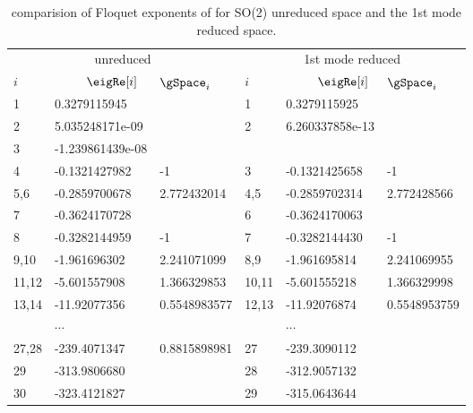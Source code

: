 \begin{table}[ht]
  \centering
  \begin{tabular}{l l l |l l l}
    \multicolumn{3}{c}{unreduced} & \multicolumn{3}{c}{1st mode reduced}\\
    $i$ & ~~~~~$\eigRe[i]$  & $\gSpace_{i}$  & $i$ & ~~~~~$\eigRe[i]$ & $\gSpace_{i}$  \\
    \hline
    1  &     0.3279115945    &               & 1  &   0.3279115925      &                \\
    2  &     5.035248171e-09 &               & 2  &   6.260337858e-13   &                \\
    3  &    -1.239861439e-08 &               &    &                                      \\
    4  &    -0.1321427982    &  -1           & 3  &   -0.1321425658     &  -1            \\
    5,6&    -0.2859700678    &  2.772432014  & 4,5&   -0.2859702314     &  2.772428566   \\
    7  &    -0.3624170728    &               & 6  &   -0.3624170063     &                \\
    8  &    -0.3282144959    &  -1           & 7  &   -0.3282144430     &  -1            \\
    9,10&   -1.961696302     &  2.241071099  & 8,9&   -1.961695814      &  2.241069955   \\
    11,12&  -5.601557908     &  1.366329853  &10,11&  -5.601555218      &  1.366329998   \\
    13,14&  -11.92077356     &  0.5548983577 &12,13&  -11.92076874      &  0.5548953759  \\
         &   $\cdots$        &               &    &  $\cdots$           &                \\
    27,28&  -239.4071347     &  0.8815898981 & 27 &   -239.3090112      &                \\
    29   &  -313.9806680     &               & 28 &   -312.9057132      &                \\
    30   &  -323.4121827     &               & 29 &   -315.0643644      &                \\
  \end{tabular}
  \caption{comparision of Floquet exponents of  for SO(2) unreduced space and
    the 1st mode reduced space. }
  \label{tab:floquetM1}
\end{table}